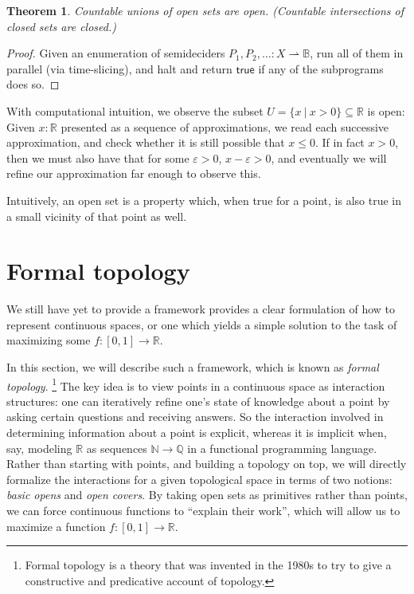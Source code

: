 \documentclass{article}
\newtheorem{theorem}{Theorem}
\newcommand{\nat}{\mathbb{N}}
\newcommand{\suchthat}{\ |\ }
\newcommand{\rat}{\mathbb{Q}}
\newcommand{\R}{\mathbb{R}}
\newcommand{\bool}{\mathbb{B}}
\begin{document}
\begin{theorem}
Countable unions of open sets are open. (Countable intersections of closed sets are closed.)
\end{theorem}
\begin{proof}
Given an enumeration of semideciders $P_1, P_2, \ldots : X \rightharpoonup \bool$, run all of them in parallel (via time-slicing), and halt and return $\mathsf{true}$ if any of the subprograms does so.
\end{proof}

With computational intuition, we observe the subset $U = \{ x \suchthat x > 0 \} \subseteq \R$ is open:
Given $x : \R$ presented as a sequence of approximations, we read each successive approximation, and check whether it is still possible that $x \le 0$. If in fact $x > 0$, then we must also have that for some $\varepsilon > 0$, $x - \varepsilon > 0$, and eventually we will refine our approximation far enough to observe this.

Intuitively, an open set is a property which, when true for a point, is also true in a small vicinity of that point as well.

\section{Formal topology}

We still have yet to provide a framework provides a clear formulation of how to represent continuous spaces, or one which yields a simple solution to the task of maximizing some $f : [0,1] \to \R$.

In this section, we will describe such a framework, which is known as \emph{formal topology}.
\footnote{Formal topology is a theory that was invented in the 1980s to try to give a constructive and predicative account of topology.}
The key idea is to view points in a continuous space as interaction structures: one can iteratively refine one's state of knowledge about a point by asking certain questions and receiving answers. So the interaction involved in determining information about a point is explicit, whereas it is implicit when, say, modeling $\R$ as sequences $\nat \to \rat$ in a functional programming language. Rather than starting with points, and building a topology on top, we will directly formalize the interactions for a given topological space in terms of two notions: \emph{basic opens} and \emph{open covers}. By taking open sets as primitives rather than points, we can force continuous functions to ``explain their work'', which will allow us to maximize a function $f : [0,1] \to \R$.
\end{document}
